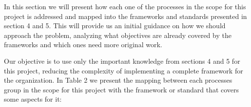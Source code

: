 In this section we will present how each one of the processes in the scope for this project is addressed and mapped into the frameworks and standards presented in section 4 and 5. This will provide us an initial guidance on how we should approach the problem, analyzing what objectives are already covered by the frameworks and which ones need more original work.\par
Our objective is to use only the important knowledge from sections 4 and 5 for this project, reducing the complexity of implementing a complete framework for the organization. In Table 2 we present the mapping between each processes group in the scope for this project with the framework or standard that covers some aspects for it:\par

\begin{table}[h!]
\centering
{}
\end{table}
